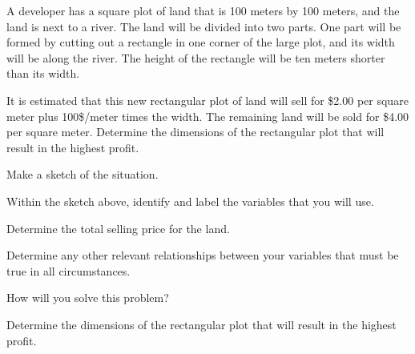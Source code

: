 \begin{problem}
  \clearpage

\item A developer has a square plot of land that is 100 meters by 100
  meters, and the land is next to a river. The land will be divided
  into two parts. One part will be formed by cutting out a rectangle
  in one corner of the large plot, and its width will be along the
  river. The height of the rectangle will be ten meters shorter than
  its width. 

  It is estimated that this new rectangular plot of land will sell for
  \$2.00 per square meter plus 100\$/meter times the width. The
  remaining land will be sold for \$4.00 per square meter.  Determine
  the dimensions of the rectangular plot that will result in the
  highest profit.

    \begin{subproblem}
      \item Make a sketch of the situation.
        \vfill
      \item Within the sketch above, identify and label the variables
        that you will use.
      \item Determine the total selling price for the land.
        
        \vfill

        \clearpage

      \item Determine any other relevant relationships between your
        variables that must be true in all circumstances.
        \vfill
      \item How will you solve this problem?
        \vspace{2em}
      \item Determine the dimensions of the rectangular plot that will
        result in the highest profit.
        \vfill
        \vfill
    \end{subproblem}

\end{problem}

\postClass

